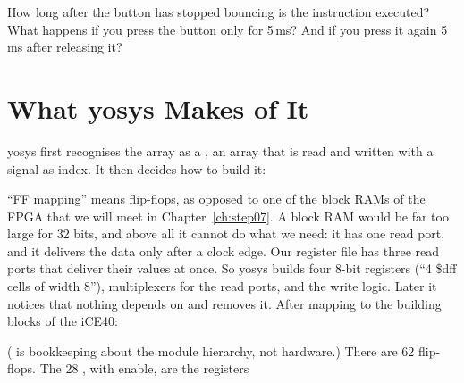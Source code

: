 {{{{{{{{{\begin{exercise}
\label{ex:step05-debounce}
How long after the button has stopped bouncing is the instruction executed?
What happens if you press the button only for 5\,ms? And if you press it
again 5\,ms after releasing it?
\end{exercise}

\section{What yosys Makes of It}
\label{sec:step05-yosys}

yosys first recognises the array as a , an array that is read and
written with a signal as index. It then decides how to build it:


``FF mapping'' means flip-flops, as opposed to one of the block RAMs of the
FPGA that we will meet in Chapter~\ref{ch:step07}. A block RAM would be far too
large for 32 bits, and above all it cannot do what we need: it has one read
port, and it delivers the data only after a clock edge. Our register file has
three read ports that deliver their values at once. So yosys builds four 8-bit
registers (``4 \$dff cells of width 8''), multiplexers for the read ports, and
the write logic. Later it notices that nothing depends on  and
removes it. After mapping to the building blocks of the iCE40:


( is bookkeeping about the module hierarchy, not hardware.)
There are 62 flip-flops. The 28 , with enable, are the registers
\ccpct{%
The 18 \cc{SB_DFFSR}, with synchronous reset, are \cc{btn_cnt}, reset when
the button agrees with \cc{btn}, and \cc{exec}. Of the 9 \cc{SB_DFF}, three
are \cc{btn_s1}, \cc{btn_s2} and \cc{btn}, and six belong to \cc{dev_hex},
as do the 7 \cc{SB_DFFESS} (Section~\ref{sec:step03-yosys}). Of the 26
\cc{SB_CARRY}, 3 belong to the counter of \cc{dev_hex}, 15 to \cc{btn_cnt},
and 8 to our adder/subtractor: one carry chain for all four operations, plus
one for the carry-out \cc{cout}.

nextpnr reports:

\outputfile{step05_pnr.txt}

One global buffer, since there is one clock. The slowest path runs from a
register through a read multiplexer and the operand logic into the carry chain
of the adder, and from its end back into a register: 21\,ns, so 47\,MHz, far
above our 12\,MHz. The switches are not synchronised; they are read only in
the cycle in which \cc{exec} is 1, and they do not change while we press the
button.

}}}}}}}}}}
